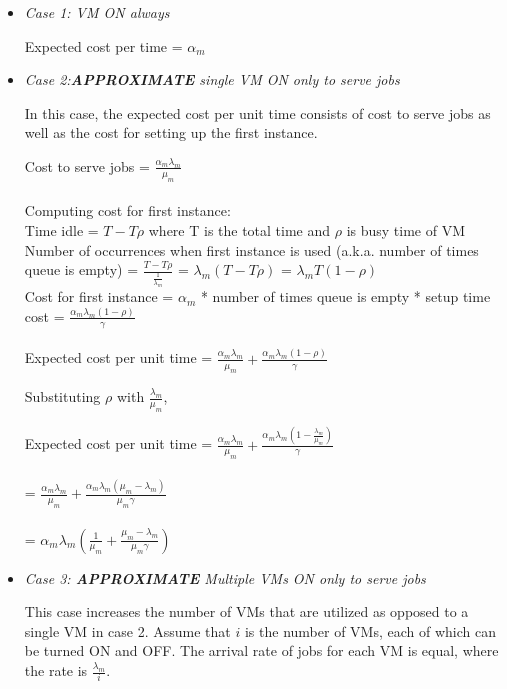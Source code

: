 \documentclass[letter,11pt]{article}
\begin{document}
\begin{itemize}
\item \textit{Case 1: VM ON always} 

Expected cost per time = $\alpha_m$ 

\item \textit{Case 2:\textbf{APPROXIMATE} single VM ON only to serve jobs} 

In this case, the expected cost per unit time consists of cost to serve jobs as well as the cost for setting up the first instance.

Cost to serve jobs  = $\frac{\alpha_m \lambda_m}{\mu_m}$ \\ \\
Computing cost for first instance: \\
Time idle = $T - T \rho$ where T is the total time and $\rho$ is busy time of VM \\
Number of occurrences when first instance is used (a.k.a. number of times 	queue is empty) = $\frac{T - T \rho}{\frac{1}{\lambda_m}}$
= $\lambda_m (T - T \rho)$ = $\lambda_m T (1 - \rho)$ \\
Cost for first instance = $\alpha_m$ * number of times queue is empty * setup time cost = $\frac{\alpha_m \lambda_m (1 - \rho)}{\gamma} $ \\ \\
Expected cost per unit time = $\frac{\alpha_m \lambda_m}{\mu_m} + \frac{\alpha_m \lambda_m (1 - \rho)}{\gamma} $ 

Substituting $\rho$ with $ \frac{\lambda_m}{\mu_m}$,

Expected cost per unit time = $\frac{\alpha_m \lambda_m}{\mu_m} + \frac{\alpha_m \lambda_m (1 - \frac{\lambda_m}{\mu_m})}{\gamma} $ \\ \\
= $\frac{\alpha_m \lambda_m}{\mu_m} + \frac{\alpha_m \lambda_m (\mu_m - \lambda_m)}{\mu_m \gamma} $ \\ \\
= $\alpha_m \lambda_m(\frac{1}{\mu_m} + \frac{\mu_m - \lambda_m}{\mu_m \gamma}) $

\item \textit{Case 3: \textbf{APPROXIMATE} Multiple VMs ON only to serve jobs} 

This case increases the number of VMs that are utilized as opposed to a single VM in case 2. Assume that $i$ is the number of VMs, each of which can be turned ON and OFF. The arrival rate of jobs for each VM is equal, where the rate is $\frac{\lambda_m}{i}$.


\end{itemize}
\end{document}
